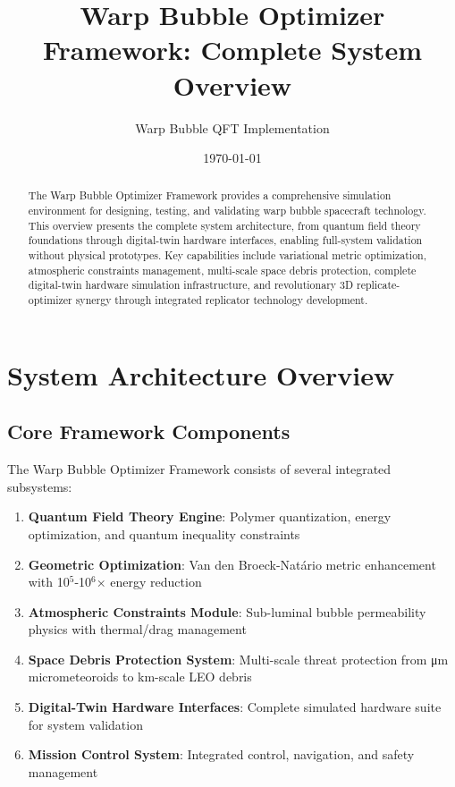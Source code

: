 \documentclass[11pt]{article}
\title{Warp Bubble Optimizer Framework: Complete System Overview}
\author{Warp Bubble QFT Implementation}
\date{\today}
\begin{document}
\maketitle

\begin{abstract}
The Warp Bubble Optimizer Framework provides a comprehensive simulation environment for designing, testing, and validating warp bubble spacecraft technology. This overview presents the complete system architecture, from quantum field theory foundations through digital-twin hardware interfaces, enabling full-system validation without physical prototypes. Key capabilities include variational metric optimization, atmospheric constraints management, multi-scale space debris protection, complete digital-twin hardware simulation infrastructure, and revolutionary 3D replicate-optimizer synergy through integrated replicator technology development.
\end{abstract}

\section{System Architecture Overview}

\subsection{Core Framework Components}

The Warp Bubble Optimizer Framework consists of several integrated subsystems:

\begin{enumerate}
\item \textbf{Quantum Field Theory Engine}: Polymer quantization, energy optimization, and quantum inequality constraints
\item \textbf{Geometric Optimization}: Van den Broeck-Natário metric enhancement with 10$^5$-10$^6$× energy reduction
\item \textbf{Atmospheric Constraints Module}: Sub-luminal bubble permeability physics with thermal/drag management
\item \textbf{Space Debris Protection System}: Multi-scale threat protection from μm micrometeoroids to km-scale LEO debris
\item \textbf{Digital-Twin Hardware Interfaces}: Complete simulated hardware suite for system validation
\item \textbf{Mission Control System}: Integrated control, navigation, and safety management
\end{enumerate}
\end{document}
